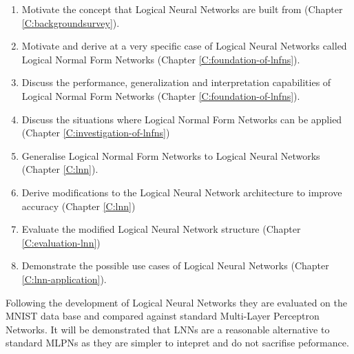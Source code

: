 \begin{enumerate}
	\item Motivate the concept that Logical Neural Networks are built from (Chapter \ref{C:backgroundsurvey}).
	\item Motivate and derive at a very specific case of Logical Neural Networks called Logical Normal Form Networks (Chapter \ref{C:foundation-of-lnfns}).
	\item Discuss the performance, generalization and interpretation capabilities of Logical Normal Form Networks (Chapter \ref{C:foundation-of-lnfns}).
	\item Discuss the situations where Logical Normal Form Networks can be applied (Chapter \ref{C:investigation-of-lnfns})
	\item Generalise Logical Normal Form Networks to Logical Neural Networks (Chapter \ref{C:lnn}).
	\item Derive modifications to the Logical Neural Network architecture to improve accuracy (Chapter \ref{C:lnn})
	\item Evaluate the modified Logical Neural Network structure (Chapter \ref{C:evaluation-lnn})
	\item Demonstrate the possible use cases of Logical Neural Networks (Chapter \ref{C:lnn-application}).
\end{enumerate}

Following the development of Logical Neural Networks they are evaluated on the MNIST data base and compared against standard Multi-Layer Perceptron Networks. It will be demonstrated that LNNs are a reasonable alternative to standard MLPNs as they are simpler to intepret and do not sacrifise peformance.